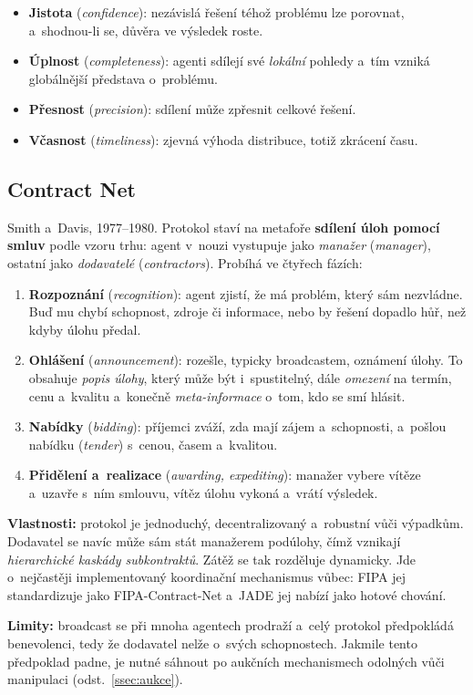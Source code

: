 \documentclass[11pt,a4paper]{article}
\theoremstyle{definition}
\begin{document}
\begin{defbox}
\begin{itemize}
\item \textbf{Jistota} (\emph{confidence}): nezávislá řešení téhož problému lze porovnat,
  a~shodnou-li se, důvěra ve výsledek roste.
\item \textbf{Úplnost} (\emph{completeness}): agenti sdílejí své \emph{lokální} pohledy a~tím
  vzniká globálnější představa o~problému.
\item \textbf{Přesnost} (\emph{precision}): sdílení může zpřesnit celkové řešení.
\item \textbf{Včasnost} (\emph{timeliness}): zjevná výhoda distribuce, totiž zkrácení času.
\end{itemize}
\end{defbox}
\subsection{Contract Net}

\begin{defbox}
Smith a~Davis, 1977--1980. Protokol staví na metafoře \textbf{sdílení úloh pomocí smluv} podle
vzoru trhu: agent v~nouzi vystupuje jako \emph{manažer} (\emph{manager}), ostatní jako
\emph{dodavatelé} (\emph{contractors}). Probíhá ve čtyřech fázích:
\begin{enumerate}
\item \textbf{Rozpoznání} (\emph{recognition}): agent zjistí, že má problém, který sám
  nezvládne. Buď mu chybí schopnost, zdroje či informace, nebo by řešení dopadlo hůř, než kdyby
  úlohu předal.
\item \textbf{Ohlášení} (\emph{announcement}): rozešle, typicky broadcastem, oznámení úlohy.
  To obsahuje \emph{popis úlohy}, který může být i~spustitelný, dále \emph{omezení} na termín,
  cenu a~kvalitu a~konečně \emph{meta-informace} o~tom, kdo se smí hlásit.
\item \textbf{Nabídky} (\emph{bidding}): příjemci zváží, zda mají zájem a~schopnosti, a~pošlou
  nabídku (\emph{tender}) s~cenou, časem a~kvalitou.
\item \textbf{Přidělení a~realizace} (\emph{awarding, expediting}): manažer vybere vítěze
  a~uzavře s~ním smlouvu, vítěz úlohu vykoná a~vrátí výsledek.
\end{enumerate}
\textbf{Vlastnosti:} protokol je jednoduchý, decentralizovaný a~robustní vůči výpadkům.
Dodavatel se navíc může sám stát manažerem podúlohy, čímž vznikají \emph{hierarchické kaskády
subkontraktů}. Zátěž se tak rozděluje dynamicky. Jde o~nejčastěji implementovaný koordinační
mechanismus vůbec: FIPA jej standardizuje jako FIPA-Contract-Net a~JADE jej nabízí jako hotové
chování.

\textbf{Limity:} broadcast se při mnoha agentech prodraží a~celý protokol předpokládá
benevolenci, tedy že dodavatel nelže o~svých schopnostech. Jakmile tento předpoklad padne, je
nutné sáhnout po aukčních mechanismech odolných vůči manipulaci (odst.~\ref{ssec:aukce}).
\end{defbox}
\end{document}
